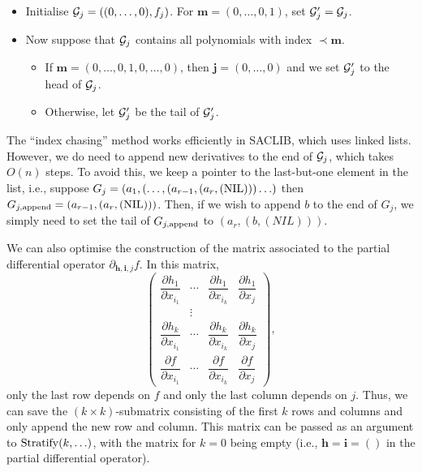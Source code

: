 \documentclass[
]{book}
\providecommand{\tightlist}{%
  \setlength{\itemsep}{0pt}\setlength{\parskip}{0pt}}
\theoremstyle{definition}
\theoremstyle{definition}
\theoremstyle{definition}
\theoremstyle{definition}
\theoremstyle{remark}
\begin{document}
\begin{itemize}
\tightlist
\item
  Initialise \({\cal G}_j = ((0,\ldots,0),f_j)\). For \(\mathbf{m} = (0,\ldots,0,1)\), set \({\cal G}'_j = {\cal G}_j\).
\item
  Now suppose that \({\cal G}_j\) contains all polynomials with index \(\prec \mathbf{m}\).

  \begin{itemize}
  \tightlist
  \item
    If \(\mathbf{m} = (0,\ldots,0,1,0,\ldots,0)\), then \(\mathbf{j} = (0,\ldots,0)\) and we set \({\cal G}'_j\) to the head of \({\cal G}_j\).
  \item
    Otherwise, let \({\cal G}'_j\) be the tail of \({\cal G}'_j\).
  \end{itemize}
\end{itemize}

The ``index chasing'' method works efficiently in SACLIB, which uses linked lists. However, we do need to append new derivatives to the end of \({\cal G}_j\), which takes \(O(n)\) steps.
To avoid this, we keep a pointer to the last-but-one element in the list, i.e., suppose \(G_j = (a_1,(\ldots,(a_{r-1},(a_r,(\rm{NIL})))\ldots)\) then \(G_{j,\rm{append}} = (a_{r-1},(a_r,(\rm{NIL})))\). Then, if we wish to append \(b\) to the end of \(G_j\), we simply need to set the tail of \(G_{j,\rm{append}}\) to \((a_r,(b,(NIL)))\).

We can also optimise the construction of the matrix associated to the partial differential operator \(\partial_{\mathbf{h},\mathbf{i},j} f\). In this matrix,
\[
\begin{pmatrix}\dfrac{\partial h_{1}}{\partial x_{i_{1}}} & \cdots & \dfrac{\partial h_{1}}{\partial x_{i_{k}}} & \dfrac{\partial h_{1}}{\partial x_{j}}\\
 & \vdots\\
\dfrac{\partial h_{k}}{\partial x_{i_{1}}} & \cdots & \dfrac{\partial h_{k}}{\partial x_{i_{k}}} & \dfrac{\partial h_{k}}{\partial x_{j}}\\
\dfrac{\partial f}{\partial x_{i_{1}}} & \cdots & \dfrac{\partial f}{\partial x_{i_{k}}} & \dfrac{\partial f}{\partial x_{j}}
\end{pmatrix},
\]
only the last row depends on \(f\) and only the last column depends on \(j\). Thus, we can save the \((k\times k)\)-submatrix consisting of the first \(k\) rows and columns and only append the new row and column. This matrix can be passed as an argument to \({\rm Stratify}(k,\ldots)\), with the matrix for \(k=0\) being empty (i.e., \(\mathbf{h} = \mathbf{i} = ()\) in the partial differential operator).
\end{document}
